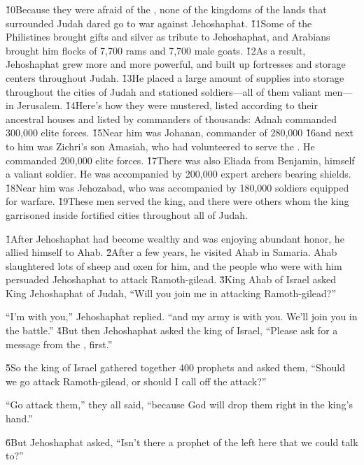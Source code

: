 \v{10}Because they were afraid of the , none of the kingdoms of the lands that surrounded Judah dared go to war against Jehoshaphat. \v{11}Some of the Philistines brought gifts and silver as tribute to Jehoshaphat, and Arabians brought him flocks of 7,700 rams and 7,700 male goats. \v{12}As a result, Jehoshaphat grew more and more powerful, and built up fortresses and storage centers throughout Judah. \v{13}He placed a large amount of supplies into storage throughout the cities of Judah and stationed soldiers---all of them valiant men---in Jerusalem. \v{14}Here's how they were mustered, listed according to their ancestral houses and listed by commanders of thousands: Adnah commanded 300,000 elite forces. \v{15}Near him was Johanan, commander of 280,000 \v{16}and next to him was Zichri's son Amasiah, who had volunteered to serve the . He commanded 200,000 elite forces. \v{17}There was also Eliada from Benjamin, himself a valiant soldier. He was accompanied by 200,000 expert archers bearing shields. \v{18}Near him was Jehozabad, who was accompanied by 180,000 soldiers equipped for warfare. \v{19}These men served the king, and there were others whom the king garrisoned inside fortified cities throughout all of Judah.

\v{1}After Jehoshaphat had become wealthy and was enjoying abundant honor, he allied himself to Ahab. \v{2}After a few years, he visited Ahab in Samaria. Ahab slaughtered lots of sheep and oxen for him, and the people who were with him persuaded Jehoshaphat to attack Ramoth-gilead. \v{3}King Ahab of Israel asked King Jehoshaphat of Judah, ``Will you join me in attacking Ramoth-gilead?''

``I'm with you,'' Jehoshaphat replied. ``and my army is with you. We'll join you in the battle.'' \v{4}But then Jehoshaphat asked the king of Israel, ``Please ask for a message from the , first.''

\v{5}So the king of Israel gathered together 400 prophets and asked them, ``Should we go attack Ramoth-gilead, or should I call off the attack?''

``Go attack them,'' they all said, ``because God will drop them right in the king's hand.''

\v{6}But Jehoshaphat asked, ``Isn't there a prophet of the  left here that we could talk to?''

